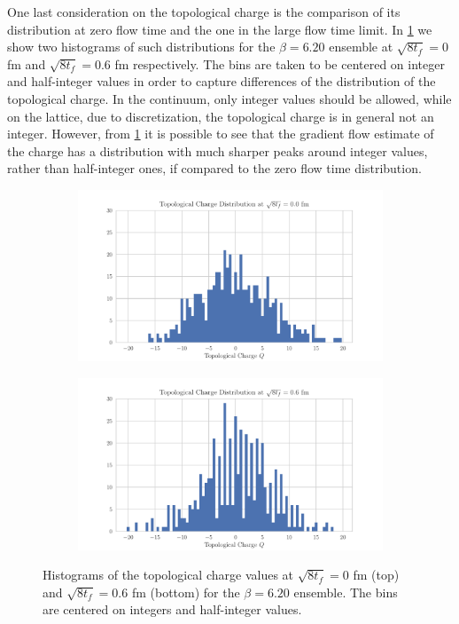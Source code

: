 One last consideration on the topological charge is the comparison of its distribution at zero flow time and the one in the large flow time limit. In \cref{fig:topchist} we show two histograms of such distributions for the $\beta = 6.20$ ensemble at $\sqrt{8t_f} = 0$ fm and $\sqrt{8t_f} = 0.6$ fm respectively. The bins are taken to be centered on integer and half-integer values in order to capture differences of the distribution of the topological charge. In the continuum, only integer values should be allowed, while on the lattice, due to discretization, the topological charge is in general not an integer. However, from \cref{fig:topchist} it is possible to see that the gradient flow estimate of the charge has a distribution with much sharper peaks around integer values, rather than half-integer ones, if compared to the zero flow time distribution. 
\begin{figure}[hbt!]
    \centering
    \begin{subfigure}{0.7\textwidth}
        \includegraphics[width=\textwidth]{results/TopcHistNoFlow.pdf}
    \end{subfigure}
    \begin{subfigure}{0.7\textwidth}
        \includegraphics[width=\textwidth]{results/TopcHistFlow.pdf}
    \end{subfigure}
    \caption{\footnotesize Histograms of the topological charge values at $\sqrt{8t_f} = 0$ fm (top) and $\sqrt{8t_f} = 0.6$ fm (bottom) for the $\beta=6.20$ ensemble. The bins are centered on integers and half-integer values.}
    \label{fig:topchist}
\end{figure} 

